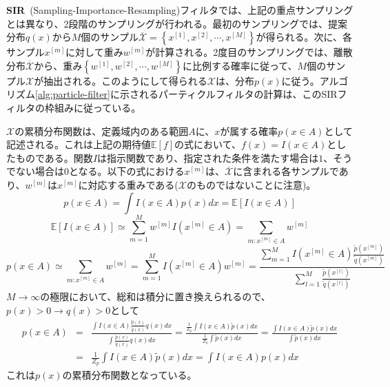 \documentclass[dvipdfmx,a4paper]{jsarticle}
\begin{document}
\textbf{SIR}~(Sampling-Importance-Resampling)フィルタでは、上記の重点サンプリングとは異なり、2段階のサンプリングが行われる。最初のサンプリングでは、提案分布$q(x)$から$M$個のサンプル$\overline{\mathcal{X}} = \left\{ x^{[1]}, x^{[2]}, \cdots, x^{[M]} \right\}$が得られる。次に、各サンプル$x^{[m]}$に対して重み$w^{[m]}$が計算される。2度目のサンプリングでは、離散分布$\overline{\mathcal{X}}$から、重み$\left\{ w^{[1]}, w^{[2]}, \cdots, w^{[M]} \right\}$に比例する確率に従って、$M$個のサンプル$\mathcal{X}$が抽出される。このようにして得られる$\mathcal{X}$は、分布$p(x)$に従う。アルゴリズム\ref{alg:particle-filter}に示されるパーティクルフィルタの計算は、このSIRフィルタの枠組みに従っている。\newline

$\mathcal{X}$の累積分布関数は、定義域内のある範囲$A$に、$x$が属する確率$p(x \in A)$として記述される。これは上記の期待値$\mathbb{E}[f]$の式において、$f(x) = I(x \in A)$としたものである。関数$I$は指示関数であり、指定された条件を満たす場合は$1$、そうでない場合は$0$となる。以下の式における$x^{[m]}$は、$\overline{\mathcal{X}}$に含まれる各サンプルであり、$w^{[m]}$は$x^{[m]}$に対応する重みである($\mathcal{X}$のものではないことに注意)。
\begin{equation}
	p(x \in A) = \int I(x \in A) p(x) dx = \mathbb{E}[I(x \in A)]
\end{equation}
\begin{equation}
	\mathbb{E}[I(x \in A)] \simeq \sum_{m = 1}^M w^{[m]} I(x^{[m]} \in A) = \sum_{m : x^{[m]} \in A} w^{[m]}
\end{equation}
\begin{equation}
	p(x \in A) \simeq \sum_{m : x^{[m]} \in A} w^{[m]} = \sum_{m = 1}^M I(x^{[m]} \in A) w^{[m]} = \frac{\displaystyle \sum_{m = 1}^M I(x^{[m]} \in A) \frac{\widetilde{p}(x^{[m]})}{\widetilde{q}(x^{[m]})}}{\displaystyle \sum_{l = 1}^M \frac{\widetilde{p}(x^{[l]})}{\widetilde{q}(x^{[l]})}}
\end{equation}
$M \to \infty$の極限において、総和は積分に置き換えられるので、$p(x) > 0 \to q(x) > 0$として
\begin{eqnarray}
	p(x \in A) &=& \frac{\displaystyle \int I(x \in A) \frac{\widetilde{p}(x)}{\widetilde{q}(x)} q(x) dx}{\displaystyle \int \frac{\widetilde{p}(x)}{\widetilde{q}(x)} q(x) dx} = \frac{\displaystyle \frac{1}{Z_q} \int I(x \in A) \widetilde{p}(x) dx}{\displaystyle \frac{1}{Z_q} \int \widetilde{p}(x) dx} = \frac{\displaystyle \int I(x \in A) \widetilde{p}(x) dx}{\displaystyle \int \widetilde{p}(x) dx} \nonumber \\
	&=& \frac{1}{Z_p} \int I(x \in A) \widetilde{p}(x) dx = \int I(x \in A) p(x) dx
\end{eqnarray}
これは$p(x)$の累積分布関数となっている。
\end{document}
